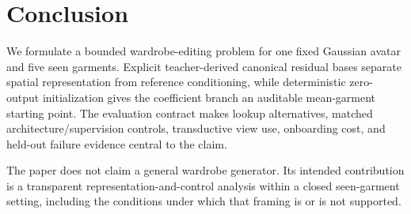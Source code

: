 \section{Conclusion}

We formulate a bounded wardrobe-editing problem for one fixed Gaussian avatar and five seen garments. Explicit teacher-derived canonical residual bases separate spatial representation from reference conditioning, while deterministic zero-output initialization gives the coefficient branch an auditable mean-garment starting point. The evaluation contract makes lookup alternatives, matched architecture/supervision controls, transductive view use, onboarding cost, and held-out failure evidence central to the claim.


The paper does not claim a general wardrobe generator. Its intended contribution is a transparent representation-and-control analysis within a closed seen-garment setting, including the conditions under which that framing is or is not supported.
